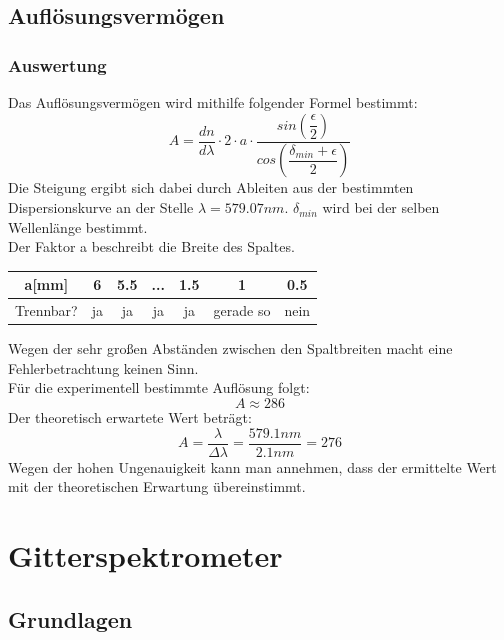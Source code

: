 \documentclass[12pt,a4paper]{article}
\begin{document}
\subsection{Auflösungsvermögen}
\subsubsection{Auswertung}
Das Auflösungsvermögen wird mithilfe folgender Formel bestimmt:
\begin{equation}
A = \dfrac{dn}{d\lambda}\cdot 2\cdot a\cdot\dfrac{sin\left(\dfrac{\epsilon}{2}\right)}{cos\left(\dfrac{\delta_{min}+\epsilon}{2}\right)}
\end{equation}
Die Steigung ergibt sich dabei durch Ableiten aus der bestimmten Dispersionskurve an der Stelle $\lambda = 579.07 nm$. $\delta_{min}$ wird bei der selben Wellenlänge bestimmt.\\
Der Faktor a beschreibt die Breite des Spaltes.
\begin{table}
\begin{tabular}{|c|c|c|c|c|c|c|}
\hline
a[mm] & 6 & 5.5 & ... & 1.5 & 1 & 0.5\\
\hline
Trennbar? & ja & ja & ja & ja & gerade so & nein\\
\hline
\end{tabular}
\end{table}
Wegen der sehr großen Abständen zwischen den Spaltbreiten macht eine Fehlerbetrachtung keinen Sinn.\\
Für die experimentell bestimmte Auflösung folgt:
\begin{equation}
A \approx 286
\end{equation}
Der theoretisch erwartete Wert beträgt:
\begin{equation}
A = \dfrac{\lambda}{\Delta \lambda} = \dfrac{579.1 nm}{2.1 nm} = 276
\end{equation}
Wegen der hohen Ungenauigkeit kann man annehmen, dass der ermittelte Wert mit der theoretischen Erwartung übereinstimmt.



\newpage
\section{Gitterspektrometer}

\subsection{Grundlagen}
\end{document}
